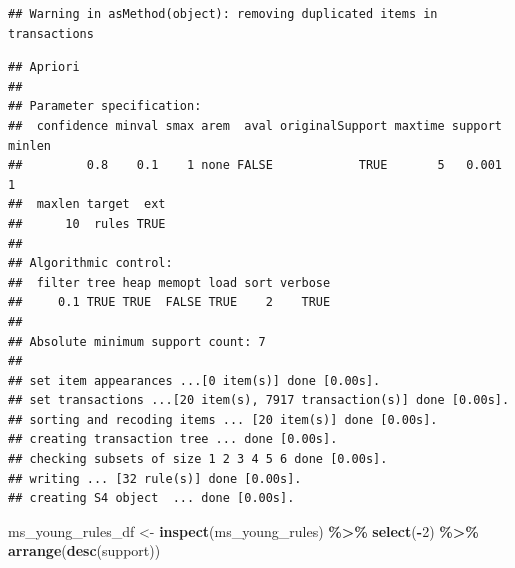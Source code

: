 \documentclass[
]{article}
\newenvironment{Shaded}{\begin{snugshade}}{\end{snugshade}}
\newcommand{\DecValTok}[1]{\textcolor[rgb]{0.00,0.00,0.81}{#1}}
\newcommand{\FunctionTok}[1]{\textcolor[rgb]{0.13,0.29,0.53}{\textbf{#1}}}
\newcommand{\NormalTok}[1]{#1}
\newcommand{\OtherTok}[1]{\textcolor[rgb]{0.56,0.35,0.01}{#1}}
\newcommand{\SpecialCharTok}[1]{\textcolor[rgb]{0.81,0.36,0.00}{\textbf{#1}}}
\begin{document}
\begin{verbatim}
## Warning in asMethod(object): removing duplicated items in transactions
\end{verbatim}

\begin{verbatim}
## Apriori
## 
## Parameter specification:
##  confidence minval smax arem  aval originalSupport maxtime support minlen
##         0.8    0.1    1 none FALSE            TRUE       5   0.001      1
##  maxlen target  ext
##      10  rules TRUE
## 
## Algorithmic control:
##  filter tree heap memopt load sort verbose
##     0.1 TRUE TRUE  FALSE TRUE    2    TRUE
## 
## Absolute minimum support count: 7 
## 
## set item appearances ...[0 item(s)] done [0.00s].
## set transactions ...[20 item(s), 7917 transaction(s)] done [0.00s].
## sorting and recoding items ... [20 item(s)] done [0.00s].
## creating transaction tree ... done [0.00s].
## checking subsets of size 1 2 3 4 5 6 done [0.00s].
## writing ... [32 rule(s)] done [0.00s].
## creating S4 object  ... done [0.00s].
\end{verbatim}

\begin{Shaded}
\begin{Highlighting}[]
\NormalTok{ms\_young\_rules\_df }\OtherTok{\textless{}{-}} \FunctionTok{inspect}\NormalTok{(ms\_young\_rules) }\SpecialCharTok{\%\textgreater{}\%} \FunctionTok{select}\NormalTok{(}\SpecialCharTok{{-}}\DecValTok{2}\NormalTok{) }\SpecialCharTok{\%\textgreater{}\%} \FunctionTok{arrange}\NormalTok{(}\FunctionTok{desc}\NormalTok{(support))}
\end{Highlighting}
\end{Shaded}
\end{document}
